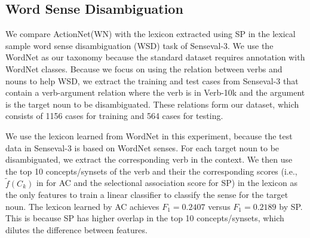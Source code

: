 \subsection{Word Sense Disambiguation}
\label{sec:wsd}
We compare ActionNet(WN) with the lexicon extracted
using SP in the lexical sample
word sense disambiguation (WSD) task of
Senseval-3\cite{senseval3}. We use the WordNet as our
taxonomy because the standard dataset requires annotation with
WordNet classes.
Because we focus on using the relation between verbs and
nouns to help WSD,
we extract the training and test cases from Senseval-3
that contain a verb-argument relation
where the verb is in Verb-10k and the argument is the target noun to be
disambiguated. These relations form our dataset, which consists of
1156 cases for training and 564 cases for testing.

We use the lexicon learned from WordNet in this experiment,
because the test data in Senseval-3 is based on WordNet senses.
For each target noun to be disambiguated, we extract
the corresponding verb in the context. We then use the
top 10 concepts/synsets of the verb and their
the corresponding scores (i.e., $\tilde{f}(C_k)$ in
 for AC and the selectional
association score for SP) in the lexicon as the only features
to train a linear classifier to classify the sense
for the target noun. The lexicon learned by AC achieves
$F_1 = 0.2407$ versus $F_1 = 0.2189$ by SP.
This is because SP has higher
overlap in the top 10 concepts/synsets, which dilutes
the difference between features.
